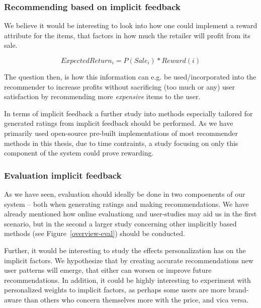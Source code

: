 \subsubsection{Recommending based on implicit feedback}

We believe it would be interesting to look into how one could implement a
reward attribute for the items, that factors in how much the retailer will
profit from its sale.

\begin{equation}
ExpectedReturn_i = P(Sale_i) * Reward(i)
\end{equation}

The question then, is how this information can e.g. be used/incorporated into
the recommender to increase profits without sacrificing (too much or any) user
satisfaction by recommending more \emph{expensive} items to the user.

In terms of implicit feedback a further study into methods especially tailored
for generated ratings from implicit feedback should be performed. As we have
primarily used open-source pre-built implementations of most recommender
methods in this thesis, due to time contraints, a study focusing on only this
component of the system could prove rewarding.


\subsubsection{Evaluation implicit feedback}

As we have seen, evaluation should ideally be done in two compoenents of our
system -- both when generating ratings and making recommendations. We have
already mentioned how online evaluationg and user-studies may aid us in the
first scenario, but in the second a larger study concerning other implicitly
based methods (see Figure~\ref{overview-eval}) should be conducted.

Further, it would be interesting to study the effects personalization has on
the implicit factors. We hypothesize that by creating accurate recommendations
new user patterns will emerge, that either can worsen or improve future
recommendations. In addition, it could be highly interesting to experiment with
personalized weights to implicit factors, as perhaps some users are more
brand-aware than others who concern themselves more with the price, and vica
versa.

